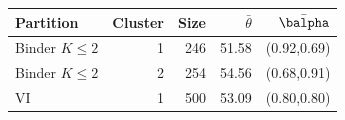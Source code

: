 \begin{tabular}{lrrrr}
\hline\hline
Partition & Cluster & Size & $\bar\theta$ & $\bar\balpha$ \\
\hline
Binder $K\leq2$ & 1 & 246 & 51.58 & (0.92,0.69) \\
Binder $K\leq2$ & 2 & 254 & 54.56 & (0.68,0.91) \\
VI & 1 & 500 & 53.09 & (0.80,0.80) \\
\hline\hline
\end{tabular}
